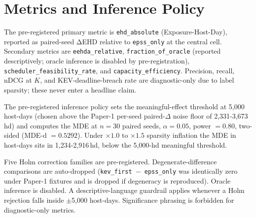 \section{Metrics and Inference Policy}
The pre-registered primary metric is \texttt{ehd\_absolute} (Exposure-Host-Day), reported as paired-seed ΔEHD relative to \texttt{epss\_only} at the central cell. Secondary metrics are \texttt{eehda\_relative}, \texttt{fraction\_of\_oracle} (reported descriptively; oracle inference is disabled by pre-registration), \texttt{scheduler\_feasibility\_rate}, and \texttt{capacity\_efficiency}. Precision, recall, nDCG at $K$, and KEV-deadline-breach rate are diagnostic-only due to label sparsity; these never enter a headline claim.

The pre-registered inference policy sets the meaningful-effect threshold at 5,000 host-days (chosen above the Paper-1 per-seed paired-$\Delta$ noise floor of 2,331-3,673\,hd) and computes the MDE at $n = 30$ paired seeds, $\alpha = 0.05$, power $= 0.80$, two-sided (MDE-d $= 0.5292$). Under $\times 1.0$ to $\times 1.5$ sparsity inflation the MDE in host-days sits in 1,234-2,916\,hd, below the 5,000-hd meaningful threshold.

Five Holm correction families are pre-registered. Degenerate-difference comparisons are auto-dropped (\texttt{kev\_first $-$ epss\_only} was identically zero under Paper-1 fixtures and is dropped if degeneracy is reproduced). Oracle inference is disabled. A descriptive-language guardrail applies whenever a Holm rejection falls inside $\pm$5,000 host-days. Significance phrasing is forbidden for diagnostic-only metrics.
